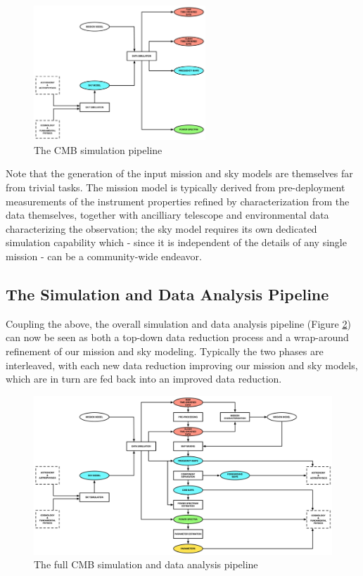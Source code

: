 \begin{figure}[htbp]
\centering
\includegraphics[width=0.575\textwidth]{Analysis/sim}
\caption{The CMB simulation pipeline}
\label{fig_sim}
\end{figure}

Note that the generation of the input mission and sky models are themselves far from trivial tasks. The mission model is typically derived from pre-deployment measurements of the instrument properties refined by characterization from the data themselves, together with ancilliary telescope and environmental data characterizing the observation; the sky model requires its own dedicated simulation capability which - since it is independent of the details of any single mission - can be a community-wide endeavor.

\subsection{The Simulation and Data Analysis Pipeline}

Coupling the above, the overall simulation and data analysis pipeline (Figure \ref{fig_simda}) can now be seen as both a top-down data reduction process and a wrap-around refinement of our mission and sky modeling. Typically the two phases are interleaved, with each new data reduction improving our mission and sky models, which are in turn are fed back into an improved data reduction.

\begin{figure}[htbp]
\includegraphics[width=1\textwidth]{Analysis/simda}
\caption{The full CMB simulation and data analysis pipeline}
\label{fig_simda}
\end{figure}

